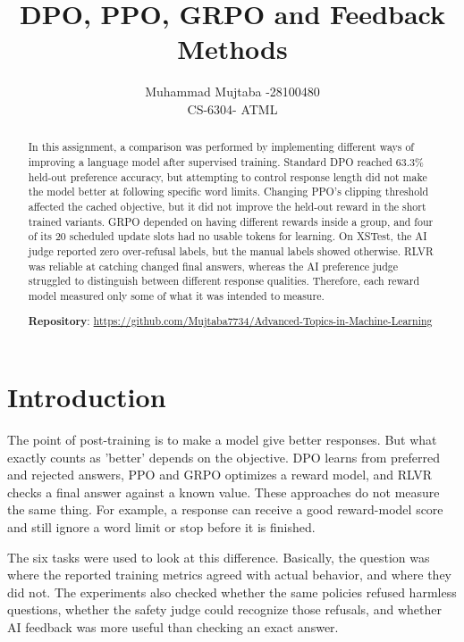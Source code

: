 \documentclass{article}
\title{DPO, PPO, GRPO and Feedback Methods}
\author{Muhammad Mujtaba -28100480\\ CS-6304- ATML}
\begin{document}
\maketitle
\setlength{\parskip}{1.5pt plus 0.4pt}
\setlength{\textfloatsep}{7pt plus 2pt minus 2pt}
\setlength{\floatsep}{6pt plus 2pt minus 2pt}
\setlength{\intextsep}{6pt plus 2pt minus 2pt}
\renewcommand{\topfraction}{0.9}
\renewcommand{\textfraction}{0.05}
\renewcommand{\floatpagefraction}{0.78}

\begin{abstract}
In this assignment, a comparison was performed by implementing different ways of improving a language model after supervised training. Standard DPO reached 63.3\% held-out preference accuracy, but attempting to control response length did not make the model better at following specific word limits. Changing PPO's clipping threshold affected the cached objective, but it did not improve the held-out reward in the short trained variants. GRPO depended on having different rewards inside a group, and four of its 20 scheduled update slots had no usable tokens for learning. On XSTest, the AI judge reported zero over-refusal labels, but the manual labels showed otherwise. RLVR was reliable at catching changed final answers, whereas the AI preference judge struggled to distinguish between different response qualities. Therefore, each reward model measured only some of what it was intended to measure.

\textbf{Repository}: \url{https://github.com/Mujtaba7734/Advanced-Topics-in-Machine-Learning}

\end{abstract}

\section{Introduction}

The point of post-training is to make a model give better responses. But what exactly counts as 'better' depends on the objective. DPO learns from preferred and rejected answers, PPO and GRPO optimizes a reward model, and RLVR checks a final answer against a known value. These approaches do not measure the same thing. For example, a response can receive a good reward-model score and still ignore a word limit or stop before it is finished.

The six tasks were used to look at this difference. Basically, the question was where the reported training metrics agreed with actual behavior, and where they did not. The experiments also checked whether the same policies refused harmless questions, whether the safety judge could recognize those refusals, and whether AI feedback was more useful than checking an exact answer.
\end{document}
